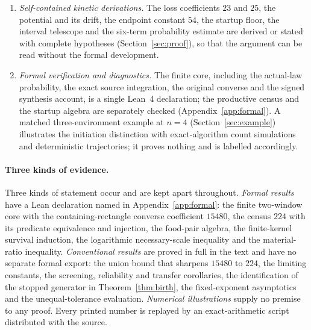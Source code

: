 \documentclass[11pt,letterpaper]{article}
\theoremstyle{plain}
\theoremstyle{definition}
\theoremstyle{remark}
\numberwithin{equation}{section}
\begin{document}
\begin{enumerate}[label=(\roman*)]
\item \emph{Self-contained kinetic derivations.} The loss coefficients $23$ and $25$, the potential and its drift, the endpoint constant $54$, the startup floor, the interval telescope and the six-term probability estimate are derived or stated with complete hypotheses (Section~\ref{sec:proof}), so that the argument can be read without the formal development.
\item \emph{Formal verification and diagnostics.} The finite core, including the actual-law probability, the exact source integration, the original converse and the signed synthesis account, is a single Lean~4 \cite{demoura2021lean4,mathlib2020} declaration; the productive census and the startup algebra are separately checked (Appendix~\ref{app:formal}). A matched three-environment example at $n=4$ (Section~\ref{sec:example}) illustrates the initiation distinction with exact-algorithm count simulations and deterministic trajectories; it proves nothing and is labelled accordingly.
\end{enumerate}

\paragraph{Three kinds of evidence.}
Three kinds of statement occur and are kept apart throughout. \emph{Formal results} have a Lean declaration named in Appendix~\ref{app:formal}: the finite two-window core with the containing-rectangle converse coefficient $15480$, the census $224$ with its predicate equivalence and injection, the food-pair algebra, the finite-kernel survival induction, the logarithmic necessary-scale inequality and the material-ratio inequality. \emph{Conventional results} are proved in full in the text and have no separate formal export: the union bound that sharpens $15480$ to $224$, the limiting constants, the screening, reliability and transfer corollaries, the identification of the stopped generator in Theorem~\ref{thm:birth}, the fixed-exponent asymptotics and the unequal-tolerance evaluation. \emph{Numerical illustrations} supply no premise to any proof. Every printed number is replayed by an exact-arithmetic script distributed with the source.
\end{document}
